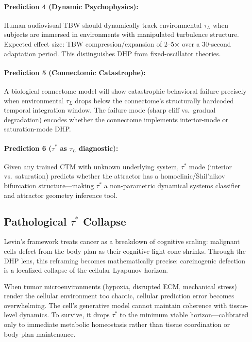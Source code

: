 \documentclass[12pt]{article}
\begin{document}
\paragraph{Prediction 4 (Dynamic Psychophysics):} Human audiovisual TBW should dynamically
track environmental $\tau_L$ when subjects are immersed in environments with manipulated
turbulence structure. Expected effect size: TBW compression/expansion of 2--5$\times$ over
a 30-second adaptation period. This distinguishes DHP from fixed-oscillator theories.

\paragraph{Prediction 5 (Connectomic Catastrophe):} A biological connectome model will show
catastrophic behavioral failure precisely when environmental $\tau_L$ drops below the
connectome's structurally hardcoded temporal integration window. The failure mode (sharp
cliff vs.\ gradual degradation) encodes whether the connectome implements interior-mode
or saturation-mode DHP.

\paragraph{Prediction 6 ($\tau^*$ as $\tau_L$ diagnostic):} Given any trained CTM with
unknown underlying system, $\tau^*$ mode (interior vs.\ saturation) predicts whether the
attractor has a homoclinic/\v{S}hil'nikov bifurcation structure---making $\tau^*$ a
non-parametric dynamical systems classifier and attractor geometry inference tool.

\subsection{Pathological $\tau^*$ Collapse}

Levin's framework treats cancer as a breakdown of cognitive scaling: malignant cells defect
from the body plan as their cognitive light cone shrinks. Through the DHP lens, this
reframing becomes mathematically precise: carcinogenic defection is a localized collapse of
the cellular Lyapunov horizon.

When tumor microenvironments (hypoxia, disrupted ECM, mechanical stress) render the cellular
environment too chaotic, cellular prediction error becomes overwhelming. The cell's
generative model cannot maintain coherence with tissue-level dynamics. To survive, it drops
$\tau^*$ to the minimum viable horizon---calibrated only to immediate metabolic homeostasis
rather than tissue coordination or body-plan maintenance.
\end{document}
